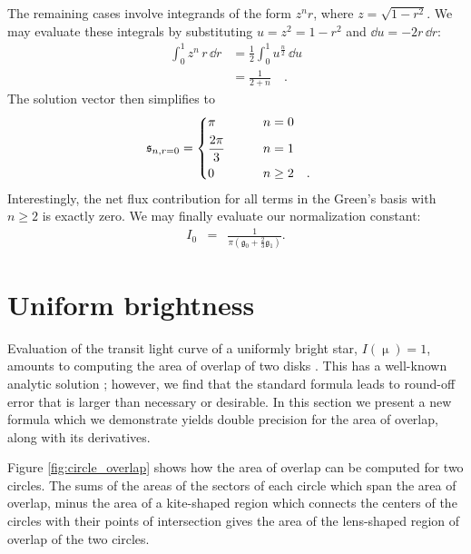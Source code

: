 \documentclass[modern,trackchanges]{aastex63}
\newcommand{\edited}{}
\begin{document}
The remaining cases involve integrands of the form $z^n r$,
where $z = \sqrt{1 - r^2}$. We may evaluate
these integrals by substituting $u = z^2 = 1 - r^2$ and $\dd u = -2r \, \dd r$:
%
\begin{align}
    \label{eq:normalization5}
    \int_0^1 z^n \, r \, \dd r &= \frac{1}{2} \int_0^1 u^\frac{n}{2} \, \dd u \nonumber \\[0.5em]
                               &= \frac{1}{2 + n} \quad.
\end{align}
%
The solution vector then simplifies to
%
\begin{align}
    \label{eq:normalization6}
    \mathfrak{s}_{n,r=0} &=
    \begin{dcases}
        \pi & \qquad n = 0
        \\
        \frac{2\pi}{3} & \qquad n = 1
        \\
        0 & \qquad n \ge 2 \quad.
    \end{dcases}
\end{align}
%
Interestingly, the net flux contribution for all terms in the Green's basis with
$n \ge 2$ is exactly zero. We may finally evaluate our normalization constant:
%
\begin{eqnarray}
    \label{eq:normalization}
    I_0 &=& \frac{1}{\pi(\mathfrak{g}_0+ \tfrac{2}{3} \mathfrak{g}_1)}.
\end{eqnarray}
%




\section{Uniform brightness}

\label{sec:uniform}

Evaluation of the transit light curve of a uniformly bright star, $I(\upmu)=1$, 
amounts to computing the
area of overlap of two disks \citep{MandelAgol2002}.  This has a well-known
analytic solution \citep[e.g.][]{Weisstein2018};  however, we find that the
standard formula leads to round-off error that is larger than necessary
or desirable.  In this section we present a new formula which we demonstrate
yields {\edited double} precision for the area of overlap, along with its derivatives.

Figure \ref{fig:circle_overlap} shows how the area of overlap can be computed
for two circles.  The sums of the areas of the sectors of each circle which span
the area of overlap, minus the area of a kite-shaped region which connects the
centers of the circles with their points of intersection gives the area of the
lens-shaped region of overlap of the two circles.
\end{document}
